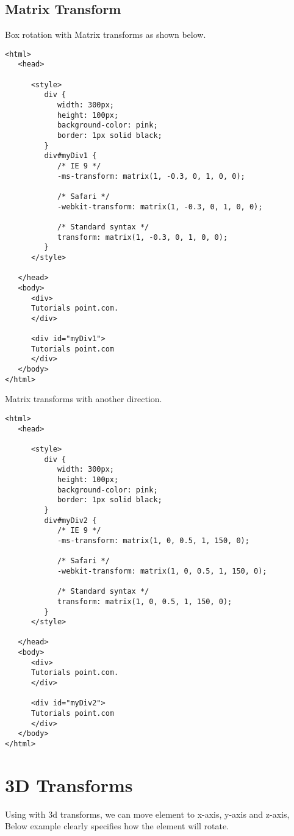 \documentclass[a4paper,oneside]{book}
\numberwithin{equation}{chapter}
\begin{document}
\subsection{Matrix Transform}
Box rotation with Matrix transforms as shown below.
\begin{verbatim}
<html>
   <head>
   
      <style>
         div {
            width: 300px;
            height: 100px;
            background-color: pink;
            border: 1px solid black;
         }
         div#myDiv1 {
            /* IE 9 */
            -ms-transform: matrix(1, -0.3, 0, 1, 0, 0);
            
            /* Safari */
            -webkit-transform: matrix(1, -0.3, 0, 1, 0, 0); 
            
            /* Standard syntax */
            transform: matrix(1, -0.3, 0, 1, 0, 0); 
         }
      </style>
      
   </head>
   <body>
      <div>
      Tutorials point.com.
      </div>
      
      <div id="myDiv1">
      Tutorials point.com
      </div>
   </body>
</html>
\end{verbatim}
Matrix transforms with another direction.
\begin{verbatim}
<html>
   <head>
   
      <style>
         div {
            width: 300px;
            height: 100px;
            background-color: pink;
            border: 1px solid black;
         }
         div#myDiv2 {
            /* IE 9 */
            -ms-transform: matrix(1, 0, 0.5, 1, 150, 0);
            
            /* Safari */	
            -webkit-transform: matrix(1, 0, 0.5, 1, 150, 0);
            
            /* Standard syntax */
            transform: matrix(1, 0, 0.5, 1, 150, 0); 
         }
      </style>
      
   </head>
   <body>
      <div>
      Tutorials point.com.
      </div>
      
      <div id="myDiv2">
      Tutorials point.com
      </div>
   </body>
</html>
\end{verbatim}
\section{3D Transforms}
Using with 3d transforms, we can move element to x-axis, y-axis and z-axis, Below example clearly specifies how the element will rotate.
\end{document}

